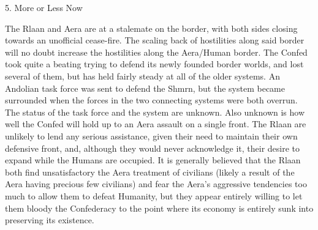 5. More or Less Now

The Rlaan and Aera are at a stalemate on the border, with both sides closing towards an unofficial cease-fire. The scaling back of hostilities along said border will no doubt increase the hostilities along the Aera/Human border. The Confed took quite a beating trying to defend its newly founded border worlds, and lost several of them, but has held fairly steady at all of the older systems. An Andolian task force was sent to defend the Shmrn, but the system became surrounded when the forces in the two connecting systems were both overrun. The status of the task force and the system are unknown. Also unknown is how well the Confed will hold up to an Aera assault on a single front. The Rlaan are unlikely to lend any serious assistance, given their need to maintain their own defensive front, and, although they would never acknowledge it, their desire to expand while the Humans are occupied. It is generally believed that the Rlaan both find unsatisfactory the Aera treatment of civilians (likely a result of the Aera having precious few civilians) and fear the Aera’s aggressive tendencies too much to allow them to defeat Humanity, but they appear entirely willing to let them bloody the Confederacy to the point where its economy is entirely sunk into preserving its existence.

